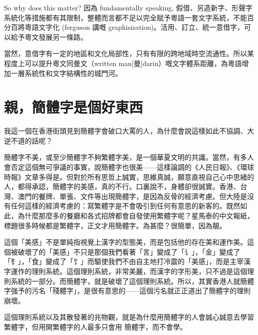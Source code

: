 So why does this matter? 因為 fundamentally speaking, 假借、另造新字、形聲字系統化等措施都有其限制，整體而言都不足以完全賦予粵語一套文字系統，不能百分百將粵語文字化 (ferguson 講嘅 graphisization)。活用、訂立、統一意借字，可以給予粵文發展另一條路。

當然，意借字有一定的地區和文化局部性，只有有限的跨地域時空流通性。所以某程度上可以提升粵文同曼文（written man[曼]darin）嘅文字體系距離，為粵語增加一層系統性和文字結構性的城門河。


\section{親，簡體字是個好東西}

我這一個在香港街頭見到簡體字會破口大罵的人，為什麼會說這樣如此不協調、大逆不道的話呢？

簡體字不美，或至少簡體字不夠繁體字美，是一個華夏文明的共識。當然，有多人會否定這個無可爭議的事實，說簡體字也很美——這樣論調的《人民日報》、《環球時報》文章多得是。但對於所有思哲上誠實，思維真誠，願意直視自己心中思緒的人，都得承認，簡體字的美感，真的不行。口裏說不，身體卻很誠實。香港、台灣、澳門的餐牌、單張、文件等出現簡體字，是因為反骨的經濟考慮。但大陸是沒有任何這樣的經濟考慮的：寫繁體字是不會吸引到任何有意思的新客的。既然如此，為什麼那麼多的餐廳和各式招牌都會自發使用繁體字呢？星馬泰的中文報紙，標題很多時候都是繁體字，正文才用簡體字。為甚麼？很簡單，因為靚。

這個「美感」不是單純指視覺上漢字的型態美，而是包括他的存在美和運作美。這個被破壞了的「美感」不只是那個我們看著「言」變成了「讠」，「金」變成了「钅」，「食」變成了「饣」而驅使我們不由自主地打冷震的「美感」，而是主宰漢字運作的理則系統。這個理則系統，非常美麗，而漢字的字形美，只不過是這個理則系統的一部分。而簡體字，就是破壞了這個理則系統。所以，其實香港人就簡體字強予的污名「殘體字」，是很有意思的——這個污名就正正道出了簡體字的理則崩壞。

這個理則系統以及其散發著的兆物觀，就是為什麼用簡體字的人會誠心誠意去學習繁體字，但用開繁體字的人最多只會用 簡體字，而不會學。

